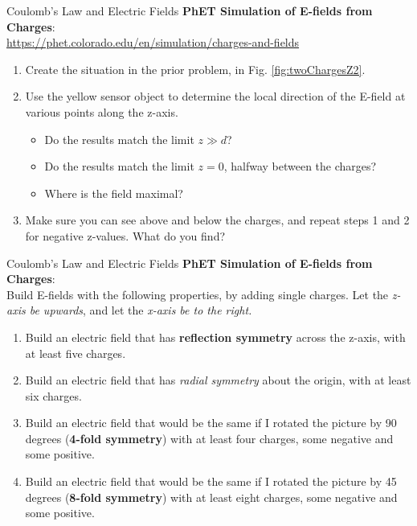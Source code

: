 \documentclass{beamer}
\begin{document}
\begin{frame}{Coulomb’s Law and Electric Fields}
\textbf{PhET Simulation of E-fields from Charges}: \\ \vspace{0.5cm}
\url{https://phet.colorado.edu/en/simulation/charges-and-fields}
\begin{enumerate}
\item Create the situation in the prior problem, in Fig. \ref{fig:twoChargesZ2}.
\item Use the yellow sensor object to determine the local direction of the E-field at various points along the z-axis.
\begin{itemize}
\item Do the results match the limit $z\gg d$?
\item Do the results match the limit $z = 0$, halfway between the charges?
\item Where is the field maximal?
\end{itemize}
\item Make sure you can see above and below the charges, and repeat steps 1 and 2 for negative z-values.  What do you find?
\end{enumerate}
\end{frame}

\begin{frame}{Coulomb’s Law and Electric Fields}
\small
\textbf{PhET Simulation of E-fields from Charges}: \\ \vspace{0.5cm}
Build E-fields with the following properties, by adding single charges.  Let the \textit{z-axis be upwards}, and let the \textit{x-axis be to the right.}
\begin{enumerate}
\item Build an electric field that has \textbf{reflection symmetry} across the z-axis, with at least five charges.
\item Build an electric field that has \textit{radial symmetry} about the origin, with at least six charges.
\item Build an electric field that would be the same if I rotated the picture by 90 degrees (\textbf{4-fold symmetry}) with at least four charges, some negative and some positive.
\item Build an electric field that would be the same if I rotated the picture by 45 degrees (\textbf{8-fold symmetry}) with at least eight charges, some negative and some positive.
\end{enumerate}
\end{frame}
\end{document}
